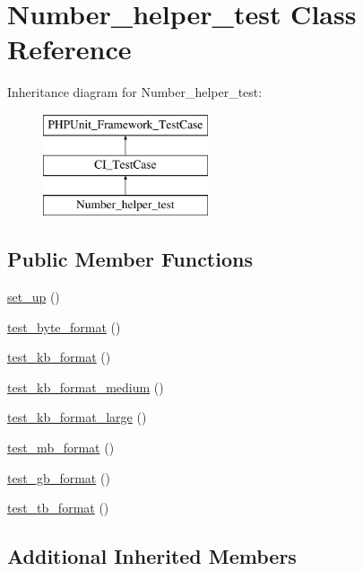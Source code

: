\hypertarget{class_number__helper__test}{}\section{Number\+\_\+helper\+\_\+test Class Reference}
\label{class_number__helper__test}
Inheritance diagram for Number\+\_\+helper\+\_\+test\+:\begin{figure}[H]
\begin{center}
\leavevmode
\includegraphics[height=3.000000cm]{class_number__helper__test}
\end{center}
\end{figure}
\subsection*{Public Member Functions}
\begin{DoxyCompactItemize}
\item 
\hyperlink{class_number__helper__test_a69829875c8d4b6ce94908445c4155741}{set\+\_\+up} ()
\item 
\hyperlink{class_number__helper__test_ae9ca0d1b6ebd860133c7e61c9e644ddf}{test\+\_\+byte\+\_\+format} ()
\item 
\hyperlink{class_number__helper__test_afb07fb6ef6147f81003d3fac328cee21}{test\+\_\+kb\+\_\+format} ()
\item 
\hyperlink{class_number__helper__test_a0bb4a35c7c408e99b507ef3075e02180}{test\+\_\+kb\+\_\+format\+\_\+medium} ()
\item 
\hyperlink{class_number__helper__test_a4cbdb003b832be24f5f05eebeabcf0d3}{test\+\_\+kb\+\_\+format\+\_\+large} ()
\item 
\hyperlink{class_number__helper__test_a958b732409d44d59a2cbccc0786b4b2a}{test\+\_\+mb\+\_\+format} ()
\item 
\hyperlink{class_number__helper__test_a3ab96a845aaa711e0aecba59ec58371e}{test\+\_\+gb\+\_\+format} ()
\item 
\hyperlink{class_number__helper__test_a4e03934497c4f2945c74f6ed3be1c52a}{test\+\_\+tb\+\_\+format} ()
\end{DoxyCompactItemize}
\subsection*{Additional Inherited Members}


